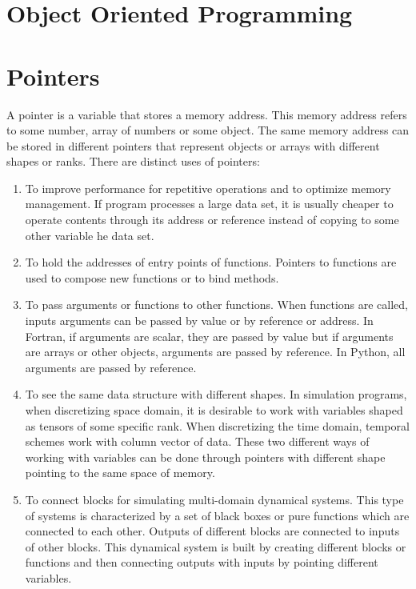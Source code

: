 \newpage 
\section{Object Oriented Programming}

\newpage 
\section{Pointers} 

A pointer is a variable that stores a memory address. 
This memory address refers to some number, array of numbers or some object. 
The same memory address can be stored in different pointers that represent  
objects or arrays with different shapes or ranks. 
There are  distinct uses of pointers: 
\begin{enumerate}
\item To improve performance for repetitive operations and to optimize memory management. 
If program processes a large data set, it is usually cheaper to operate contents through 
its address or reference instead of copying to some other variable he data set. 
\item To hold the addresses of entry points of functions. Pointers to functions 
are used to compose new functions or to bind methods. 
\item To pass arguments or functions to other functions.
When functions are called, inputs arguments can be passed by value or by reference or address. 
In Fortran, if arguments are scalar, they are passed by value but if arguments are arrays or other objects, 
arguments are passed by reference. 
In Python, all arguments are passed by reference. 
\item To see the same data structure  with different shapes. 
In simulation programs, when discretizing space domain, 
it is desirable to work  with variables shaped as tensors of some specific rank. 
When discretizing the time domain, temporal schemes work with column vector of data. 
These two different ways of working with variables can be done through pointers with different shape pointing to
the same space of memory. 
\item To connect blocks for simulating multi-domain dynamical systems. 
This type of systems is characterized by a set of black boxes or pure functions which are connected to 
each other. Outputs of different blocks are connected to inputs of other blocks. 
This dynamical system is built by creating different blocks or functions and then  
connecting outputs with inputs by pointing different variables. 

\end{enumerate}
